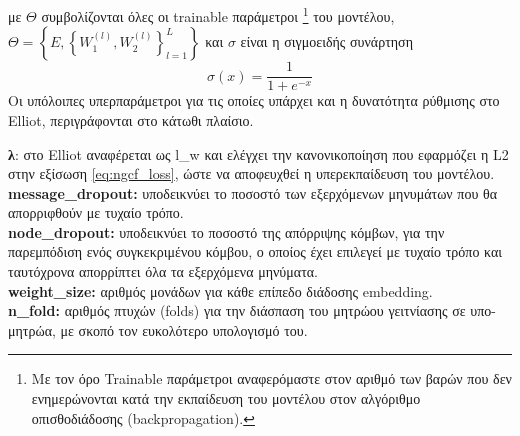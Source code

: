 με $ \Theta $ συμβολίζονται όλες οι trainable παράμετροι \footnote{ Με τον όρο Trainable  παράμετροι αναφερόμαστε στον αριθμό των βαρών που δεν ενημερώνονται κατά την εκπαίδευση του μοντέλου στον αλγόριθμο οπισθοδιάδοσης (backpropagation).} του μοντέλου, $ \Theta = \left\lbrace E, \left\lbrace W_1^{\left( l \right)} , W_2^{\left( l\right)}  \right\rbrace_{l=1} ^{L} \right\rbrace  $ και $\sigma$ είναι η σιγμοειδής συνάρτηση \begin{equation}
	\label{eq:sigmoid_function}
	\sigma(x) = \frac{1}{1 + e^{-x}}
\end{equation} Οι υπόλοιπες υπερπαράμετροι για τις οποίες υπάρχει και η δυνατότητα ρύθμισης στο Elliot, περιγράφονται στο κάτωθι πλαίσιο.
\begin{tcolorbox}[
colframe=blue!25,
colback=blue!10,
coltitle=blue!20!black,  
fonttitle=\bfseries,
adjusted title= Υπερπαράμετροι]
\textbf{λ}: στο Elliot αναφέρεται ως l\_w και ελέγχει την κανονικοποίηση που εφαρμόζει η L2 στην εξίσωση \eqref{eq:ngcf_loss}, ώστε να αποφευχθεί η υπερεκπαίδευση του μοντέλου.\\
\textbf{message\_dropout:} υποδεικνύει το ποσοστό των εξερχόμενων μηνυμάτων που θα απορριφθούν με τυχαίο τρόπο.\\
\textbf{node\_dropout:} υποδεικνύει το ποσοστό της απόρριψης κόμβων, για την παρεμπόδιση ενός συγκεκριμένου κόμβου, ο οποίος έχει επιλεγεί με τυχαίο τρόπο και ταυτόχρονα απορρίπτει όλα τα εξερχόμενα μηνύματα.\\
\textbf{weight\_size:} αριθμός μονάδων για κάθε επίπεδο διάδοσης embedding.\\
\textbf{n\_fold:} αριθμός πτυχών (folds) για την διάσπαση του μητρώου γειτνίασης σε υπο-μητρώα, με σκοπό τον ευκολότερο υπολογισμό του. 
\end{tcolorbox}
\newpage
